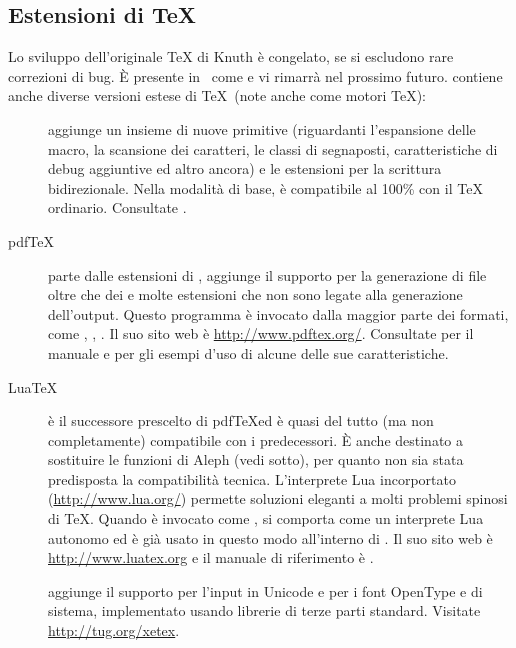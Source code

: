 \documentclass{article}
\begin{document}
\subsection{Estensioni di \protect\TeX}
\label{sec:tex-extensions}

Lo sviluppo dell'originale \TeX{} di Knuth è congelato, se si escludono
rare correzioni di bug. È presente in \TL\ come  e vi
rimarrà nel prossimo futuro. \TL{} contiene anche diverse versioni estese
di \TeX\ (note anche come motori \TeX):

\begin{description}

\item [\eTeX] aggiunge un insieme di nuove primitive \label{text:etex}
(riguardanti l'espansione delle macro, la scansione dei caratteri, le
classi di segnaposti, caratteristiche di debug aggiuntive ed altro ancora)
e le estensioni \TeXXeT{} per la scrittura bidirezionale. Nella modalità
di base, \eTeX{} è compatibile al 100\% con il \TeX{} ordinario.
Consultate .

\item [pdf\TeX] parte dalle estensioni di \eTeX, aggiunge il supporto per
la generazione di file  oltre che dei \dvi{} e molte estensioni
che non sono legate alla generazione dell'output. Questo programma è
invocato dalla maggior parte dei formati, come , ,
. Il suo sito web è \url{http://www.pdftex.org/}.
Consultate  per il manuale
e  per gli
esempi d'uso di alcune delle sue caratteristiche.

\item [Lua\TeX] è il successore prescelto di pdf\TeX ed è quasi del tutto
(ma non completamente) compatibile con i predecessori. È anche destinato a
sostituire le funzioni di Aleph (vedi sotto), per quanto non sia stata
predisposta la compatibilità tecnica. L'interprete Lua incorportato
(\url{http://www.lua.org/}) permette soluzioni eleganti a molti problemi
spinosi di \TeX. Quando è invocato come , si comporta
come un interprete Lua autonomo ed è già usato in questo modo all'interno
di \TL. Il suo sito web è \url{http://www.luatex.org} e il manuale di
riferimento è .

\item [\XeTeX] aggiunge il supporto per l'input in Unicode e per i font
OpenType e di sistema, implementato usando librerie di terze parti
standard. Visitate \url{http://tug.org/xetex}.


\end{description}
\end{document}
